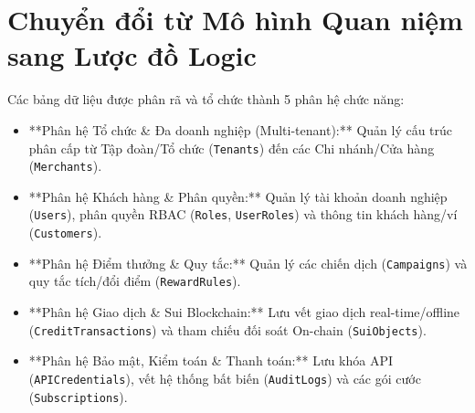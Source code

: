 \section{Chuyển đổi từ Mô hình Quan niệm sang Lược đồ Logic}

Các bảng dữ liệu được phân rã và tổ chức thành 5 phân hệ chức năng:
\begin{itemize}
    \item **Phân hệ Tổ chức \& Đa doanh nghiệp (Multi-tenant):** Quản lý cấu trúc phân cấp từ Tập đoàn/Tổ chức (\texttt{Tenants}) đến các Chi nhánh/Cửa hàng (\texttt{Merchants}).
    \item **Phân hệ Khách hàng \& Phân quyền:** Quản lý tài khoản doanh nghiệp (\texttt{Users}), phân quyền RBAC (\texttt{Roles}, \texttt{UserRoles}) và thông tin khách hàng/ví (\texttt{Customers}).
    \item **Phân hệ Điểm thưởng \& Quy tắc:** Quản lý các chiến dịch (\texttt{Campaigns}) và quy tắc tích/đổi điểm (\texttt{RewardRules}).
    \item **Phân hệ Giao dịch \& Sui Blockchain:** Lưu vết giao dịch real-time/offline (\texttt{CreditTransactions}) và tham chiếu đối soát On-chain (\texttt{SuiObjects}).
    \item **Phân hệ Bảo mật, Kiểm toán \& Thanh toán:** Lưu khóa API (\texttt{APICredentials}), vết hệ thống bất biến (\texttt{AuditLogs}) và các gói cước (\texttt{Subscriptions}).
\end{itemize}